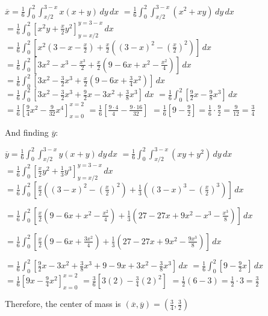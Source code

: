 \begin{Answer}[ref = c_of_m]
\begin{enumerate}
$\overline{x} = \frac{1}{6} \int_0^2 \int_{x/2}^{3 - x} x \left(x + y \right)
\,dy\,dx$
$= \frac{1}{6} \int_0^2 \int_{x/2}^{3 - x} \left(x^2 + xy \right)\,dy\,dx$
$= \frac{1}{6} \int_0^2 \left[ x^2y + \frac{x}{2}y^2 \right]_{y = x/2}^{y = 3 -
x}\,dx$
$= \frac{1}{6} \int_0^2 \left[ x^2\left( 3 - x - \frac{x}{2} \right) + \frac{x
}{2}\left( \left( 3 - x \right)^2 - \left( \frac{x}{2} \right)^2 \right) 
\right]\,dx$
$= \frac{1}{6} \int_0^2 \left[ 3x^2 - x^3 - \frac{x^3}{2} + \frac{x}{2} \left(
9 - 6x + x^2 - \frac{x^2}{4} \right) \right]\,dx$
$= \frac{1}{6} \int_0^2 \left[ 3x^2 - \frac{3}{2}x^3 + \frac{x}{2} \left( 9 - 
6x + \frac{3}{4}x^2 \right) \right]\,dx$
$= \frac{1}{6} \int_0^2 \left[ 3x^2 - \frac{3}{2}x^3 + \frac{9}{2}x - 3x^2 + 
\frac{3}{8}x^3 \right]\,dx$
$= \frac{1}{6} \int_0^2 \left[ \frac{9}{2}x - \frac{9}{8}x^3 \right]\,dx$
$= \frac{1}{6} \left[ \frac{9}{4}x^2 - \frac{9}{32}x^4 \right]_{x = 0}^{x = 2}$
$= \frac{1}{6} \left[ \frac{9 \cdot 4}{4} - \frac{9 \cdot 16}{32} \right]$
$= \frac{1}{6} \left[9 - \frac{9}{2} \right] = \frac{1}{6} \cdot \frac{9}{2} = 
\frac{9}{12} = \frac{3}{4}$

And finding $\overline{y}$:

$\overline{y} = \frac{1}{6} \int_0^2 \int_{x/2}^{3 - x} y \left(x + y \right)
\,dy\,dx$
$= \frac{1}{6} \int_0^2 \int_{x/2}^{3-x} \left(xy + y^2 \right)\,dy\,dx$
$= \frac{1}{6} \int_0^2 \left[ \frac{x}{2}y^2 + \frac{1}{3}y^3 \right]_{y = x/2
}^{y = 3 - x}\,dx$
$= \frac{1}{6} \int_0^2 \left[ \frac{x}{2} \left( \left( 3 - x \right)^2 - 
\left( \frac{x}{2} \right)^2 \right) + \frac{1}{3} \left( \left( 3 - x \right)^
3 - \left( \frac{x}{2} \right)^3 \right) \right]\,dx$

$= \frac{1}{6} \int_0^2 \left[ \frac{x}{2} \left( 9 - 6x + x^2 - \frac{x^2}{4} 
\right) + \frac{1}{3} \left( 27 - 27x +9x^2 - x^3 - \frac{x^3}{8} \right) 
\right]\,dx$

$= \frac{1}{6} \int_0^2 \left[ \frac{x}{2} \left( 9 - 6x + \frac{3x^2}{4} 
\right) + \frac{1}{3} \left( 27 - 27x + 9x^2 - \frac{9x^3}{8} \right) \right]
\,dx$

$= \frac{1}{6} \int_0^2 \left[ \frac{9}{2}x - 3x^2 + \frac{3}{8}x^3 + 9 - 9x + 
3x^2 - \frac{3}{8}x^3 \right]\,dx$
$= \frac{1}{6} \int_0^2 \left[ 9 - \frac{9}{2}x  \right]\,dx$
$= \frac{1}{6} \left[ 9x - \frac{9}{4}x^2 \right]_{x = 0}^{x = 2}$
$= \frac{3}{6} \left[3(2) - \frac{3}{4}(2)^2 \right]$
$= \frac{1}{2} \left(6 - 3 \right) = \frac{1}{2} \cdot 3 = \frac{3}{2}$

Therefore, the center of mass is $\left( \overline{x}, \overline{y} \right) = 
\left( \frac{3}{4}, \frac{3}{2} \right)$
\end{enumerate}

\end{Answer}

